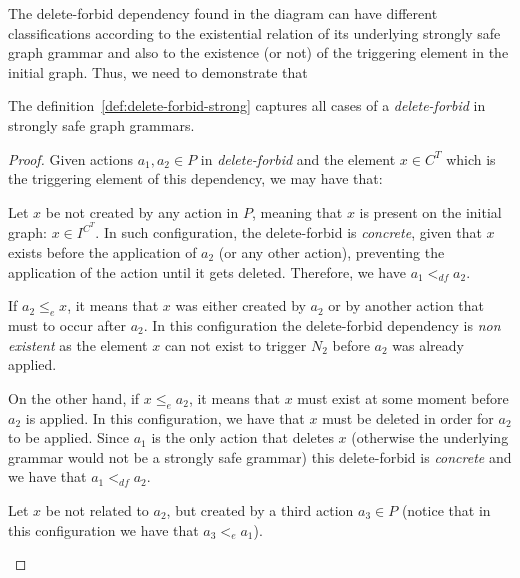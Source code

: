 
The delete-forbid dependency found in the diagram can have different classifications according to the existential relation of its underlying strongly safe graph grammar and also to the existence (or not) of the triggering element in the initial graph. Thus, we need to demonstrate that


\begin{thm} The definition~\ref{def:delete-forbid-strong} captures all cases of a \emph{delete-forbid} in strongly safe graph grammars.
\end{thm}

\begin{proof} Given actions $a_1,a_2 \in P$ in \emph{delete-forbid} and the element $x \in C^T$ which is the triggering element of this dependency, we may have that:
\hfill
\begin{description}[style=nextline,leftmargin=*]

  \item [Triggering element is present on the initial graph:]
Let $x$ be not created by any action in $P$, meaning that $x$ is present on the initial graph: $x \in I^{C^T}$. In such configuration, the delete-forbid is \emph{concrete}, given that $x$ exists before the application of $a_2$ (or any other action), preventing the application of the action until it gets deleted. Therefore, we have $a_1 <_{df} a_2$.

  \item [Triggering element is related to the action:] If $a_2 \leq_e x$, it means that $x$ was either created by $a_2$ or by another action that must to occur after $a_2$. In this configuration the delete-forbid dependency is \emph{non existent} as the element $x$ can not exist to trigger $N_2$ before $a_2$ was already applied.

    On the other hand, if $x \leq_e a_2$, it means that $x$ must exist at some moment before $a_2$ is applied. In this configuration, we have that $x$ must be deleted in order for $a_2$ to be applied. Since $a_1$ is the only action that deletes $x$ (otherwise the underlying grammar would not be a strongly safe grammar) this delete-forbid is \emph{concrete} and we have that $a_1 <_{df} a_2$.

\item [Triggering element is not related to the action:]
  Let $x$ be not related to $a_2$, but created by a third action $a_3 \in P$ (notice that in this configuration we have that $a_3 <_{e} a_1$).


\end{description}
\end{proof}
